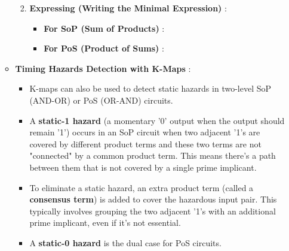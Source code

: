 \documentclass{article}
\begin{document}
\begin{itemize}
\begin{itemize}
\begin{enumerate}
\begin{itemize}
        \end{itemize}
        \item \textbf{Expressing (Writing the Minimal Expression)} :
        \begin{itemize}
            \item \textbf{For SoP (Sum of Products)} :
            \item \textbf{For PoS (Product of Sums)} :
        \end{itemize}
    \end{enumerate}
    \item \textbf{Timing Hazards Detection with K-Maps} :
    \begin{itemize}
        \item K-maps can also be used to detect static hazards in two-level SoP (AND-OR) or PoS (OR-AND) circuits.
        \item A \textbf{static-1 hazard} (a momentary '0' output when the output should remain '1') occurs in an SoP circuit when two adjacent '1's are covered by different product terms and these two terms are not "connected" by a common product term. This means there's a path between them that is not covered by a single prime implicant.
        \item To eliminate a static hazard, an extra product term (called a \textbf{consensus term}) is added to cover the hazardous input pair. This typically involves grouping the two adjacent '1's with an additional prime implicant, even if it's not essential.
        \item A \textbf{static-0 hazard} is the dual case for PoS circuits.
    \end{itemize}
\end{itemize}


\end{itemize}
\end{document}

